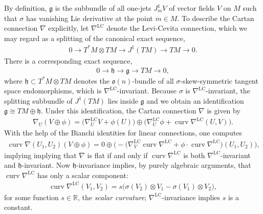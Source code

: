 \documentclass[pdftex]{sigma}
\newcommand{\levi}{\nabla^{\mathrm{LC}}}
\DeclareMathOperator{\curvature}{curv}
\numberwithin{equation}{section}
\begin{document}
By def\/inition, ${\mathfrak g} $ is the subbundle of all one-jets
$J^1_mV$ of vector f\/ields $V$ on $M$ such that $\sigma $ has vanishing
Lie derivative at the point $m \in M$. To describe the Cartan
connection $\nabla $ explicitly, let $\levi$ denote the Levi-Cevita
connection, which we may regard as a splitting of the canonical exact
sequence,
\begin{gather*} 0\rightarrow T^*\!M\otimes TM\rightarrow
  J^1 (TM)\rightarrow TM\rightarrow 0.
\end{gather*}
There is a corresponding exact sequence,
\begin{gather*}
  0\longrightarrow  {\mathfrak h} \longrightarrow {\mathfrak g} \longrightarrow  TM \longrightarrow 0,
\end{gather*}
where ${\mathfrak h}\subset T^*\!M\otimes TM$ denotes the
$\mathfrak{o}(n)$-bundle of all $\sigma$-skew-symmetric tangent space
endomorphisms, which is $\levi$-invariant. Because $\sigma $ is
$\levi$-invariant, the splitting subbundle of $J^1(TM)$ lies inside
$\mathfrak g$ and we obtain an identif\/ication ${\mathfrak g}\cong
TM\oplus{\mathfrak h}$. Under this identif\/ication, the Cartan
connection $\nabla $ is given by
\begin{gather*}
  \nabla_U(V\oplus\phi)=\big(\levi_UV+\phi (U)\big)\oplus
  \big(\levi_U\phi+\curvature\levi  (U, V)\big).
\end{gather*}
With the help of the Bianchi identities for linear connections, one
computes
\begin{gather*}
        \curvature\nabla (U_1, U_2)(V\oplus\phi)=0\oplus
        \big({-}\big(\levi_V\curvature\levi+\phi\cdot\curvature\levi\big)(U_1,U_2)\big),
\end{gather*}
implying implying that $\nabla$ is f\/lat if and only if $\curvature\levi$
is both $\levi$-invariant and ${\mathfrak h}$-invariant.  Now
${\mathfrak h} $-invariance implies, by purely algebraic arguments,
that $\curvature\levi$ has only a scalar component:
\begin{gather}
        \curvature\levi (V_1, V_2)=s\big( \sigma (V_2)\otimes V_1-\sigma
        (V_1)\otimes V_2 \big),\label{pop}
\end{gather}
for some function $ s\in{\mathbb R}$, the {\it scalar curvature};
$\levi$-invariance implies $s$ is a constant.
\end{document}
